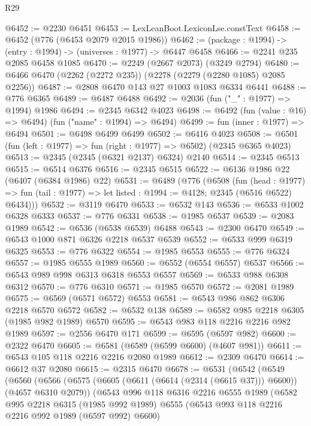 \begin{lexlean}{R29}
\begin{coremodule}
@6452 := @2230 @6451
@6453 := LexLeanBoot.LexiconLse.constText
@6458 := @6452 (@776 (@6453 @2079 @2015 @1986))
@6462 := (package : @1994) -> (entry : @1994) -> (universes : @1977) -> @6447 @6458
@6466 := @2241 @235 @2085 @6458 @1085
@6470 := @2249 (@2667 @2073) (@3249 @2794)
@6480 := @6466 @6470 (@2262 (@2272 @235)) (@2278 (@2279 (@2280 @1085) @2085 @2256))
@6487 := @2808 @6470 @143 @27 @1003 @1083 @6334 @6441
@6488 := @776 @6365
@6489 := @6487 @6488
@6492 := @2036 (fun ("_" : @1977) => @1994) @1986
@6494 := @2345 @6342 @4023
@6498 := @6492 (fun (value : @16) => @6494) (fun ("name" : @1994) => @6494)
@6499 := fun (inner : @1977) => @6494
@6501 := @6498 @6499 @6499
@6502 := @6416 @4023
@6508 := @6501 (fun (left : @1977) => fun (right : @1977) => @6502) (@2345 @6365 @4023)
@6513 := @2345 (@2345 (@6321 @2137) @6324) @2140
@6514 := @2345 @6513
@6515 := @6514 @6376
@6516 := @2345 @6515
@6522 := @6136 @1986 @22 (@6407 (@6384 @1986) @22)
@6531 := @6489
    (@776
      (@6508
        (fun (head : @1977) =>
        fun (tail : @1977) => let listed : @1994 := @4128; @2345 (@6516 @6522) @6434)))
@6532 := @3119 @6470
@6533 := @6532 @143
@6536 := @6533 @1002 @6328 @6333
@6537 := @776 @6331
@6538 := @1985 @6537
@6539 := @2083 @1989
@6542 := @6536 (@6538 @6539) @6488
@6543 := @2300 @6470
@6549 := @6543 @1000 @871 @6326 @2218 @6537 @6539
@6552 := @6533 @999 @6319 @6325
@6553 := @776 @6322
@6554 := @1985 @6553
@6555 := @776 @6324
@6557 := @1985 @6555 @1989
@6560 := @6552 (@6554 @6557) @6537
@6566 := @6543 @989 @998 @6313 @6318 @6553 @6557
@6569 := @6533 @988 @6308 @6312
@6570 := @776 @6310
@6571 := @1985 @6570
@6572 := @2081 @1989
@6575 := @6569 (@6571 @6572) @6553
@6581 := @6543 @986 @862 @6306 @2218 @6570 @6572
@6582 := @6532 @138
@6589 := @6582 @985 @2218 @6305 (@1985 @982 @1989) @6570
@6595 := @6543 @983 @118 @2216 @2216 @982 @1989
@6597 := @2556 @6470 @171
@6599 := @6595 (@6597 @982)
@6600 := @2322 @6470
@6605 := @6581 (@6589 (@6599 @6600) (@4607 @981))
@6611 := @6543 @105 @118 @2216 @2216 @2080 @1989
@6612 := @2309 @6470
@6614 := @6612 @37 @2080
@6615 := @2315 @6470
@6678 := @6531
    (@6542
      (@6549
        (@6560
          (@6566
            (@6575 (@6605 (@6611 (@6614 (@2314 (@6615 @37))) @6600)) (@4657 @6310 @2079))
            (@6543
              @996
              @118
              @6316
              @2216
              @6555
              @1989
              (@6582
                @995
                @2218
                @6315
                (@1985 @992 @1989)
                @6555
                (@6543 @993 @118 @2216 @2216 @992 @1989 (@6597 @992) @6600)

\end{coremodule}
\end{lexlean}
